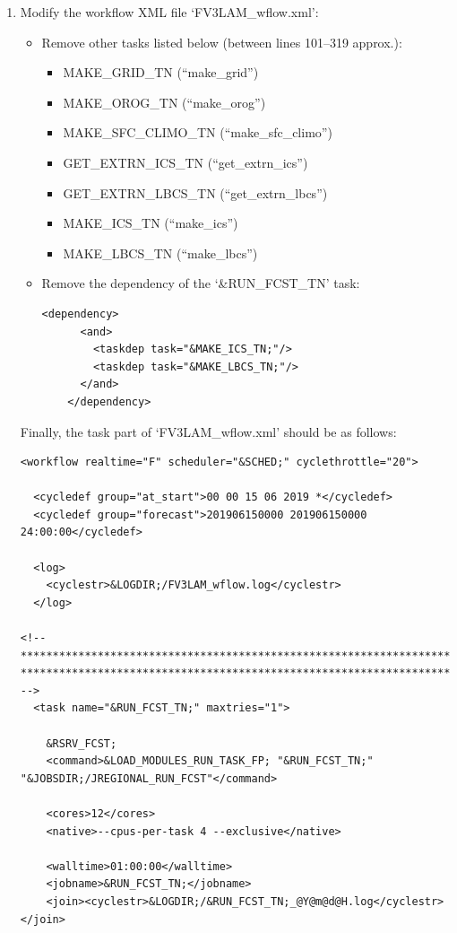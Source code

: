 \documentclass[11pt,fleqn]{report}              %
\begin{document}
\begin{enumerate}
\begin{enumerate}
\item Modify the workflow XML file `FV3LAM\_wflow.xml':
\begin{itemize}
\item Remove other tasks listed below (between lines 101--319 approx.):
\begin{itemize}
\item MAKE\_GRID\_TN (``make\_grid'')
\item MAKE\_OROG\_TN (``make\_orog'')
\item MAKE\_SFC\_CLIMO\_TN (``make\_sfc\_climo'')
\item GET\_EXTRN\_ICS\_TN (``get\_extrn\_ics'')
\item GET\_EXTRN\_LBCS\_TN (``get\_extrn\_lbcs'')
\item MAKE\_ICS\_TN (``make\_ics'')
\item MAKE\_LBCS\_TN (``make\_lbcs'')
\end{itemize}

\item Remove the dependency of the `\&RUN\_FCST\_TN' task:
\lstset{language=XML}   
\begin{lstlisting}[frame=trBL,basicstyle=\tiny]
    <dependency>
      <and>
        <taskdep task="&MAKE_ICS_TN;"/>
        <taskdep task="&MAKE_LBCS_TN;"/>
      </and>
    </dependency>
\end{lstlisting}
\end{itemize}

Finally, the task part of `FV3LAM\_wflow.xml' should be as follows:
\lstset{language=XML}   
\begin{lstlisting}[frame=trBL,basicstyle=\tiny]
<workflow realtime="F" scheduler="&SCHED;" cyclethrottle="20">

  <cycledef group="at_start">00 00 15 06 2019 *</cycledef>
  <cycledef group="forecast">201906150000 201906150000 24:00:00</cycledef>

  <log>
    <cyclestr>&LOGDIR;/FV3LAM_wflow.log</cyclestr>
  </log>

<!--
************************************************************************
************************************************************************
-->
  <task name="&RUN_FCST_TN;" maxtries="1">

    &RSRV_FCST;
    <command>&LOAD_MODULES_RUN_TASK_FP; "&RUN_FCST_TN;" "&JOBSDIR;/JREGIONAL_RUN_FCST"</command>

    <cores>12</cores>
    <native>--cpus-per-task 4 --exclusive</native>

    <walltime>01:00:00</walltime>
    <jobname>&RUN_FCST_TN;</jobname>
    <join><cyclestr>&LOGDIR;/&RUN_FCST_TN;_@Y@m@d@H.log</cyclestr></join>


\end{lstlisting}
\end{enumerate}
\end{enumerate}
\end{document}
